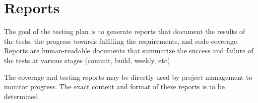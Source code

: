 %
%
\section{Reports}
\label{sec:reports}

The goal of the testing plan is to generate reports that document the results of the tests, the progress towards fulfilling the requirements, and code coverage. Reports are human-readable documents that summarize the success and failure of the tests at various stages (commit, build, weekly, etc).

The coverage and testing reports may be directly used by project management to monitor progress. The exact content and format of these reports is to be determined.

%
%
